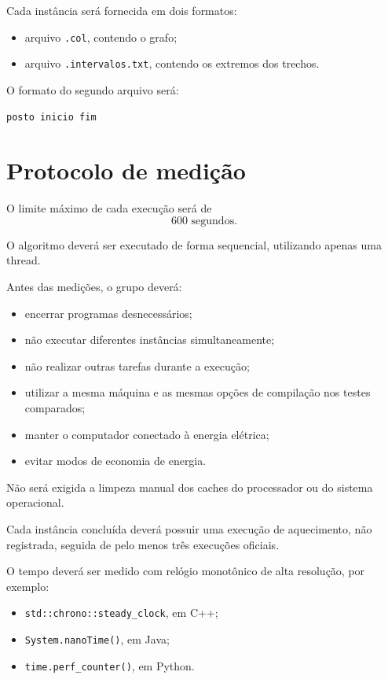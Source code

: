\documentclass[11pt,a4paper]{article}
\begin{document}
Cada instância será fornecida em dois formatos:

\begin{itemize}
    \item arquivo \texttt{.col}, contendo o grafo;
    \item arquivo \texttt{.intervalos.txt}, contendo os extremos dos trechos.
\end{itemize}

O formato do segundo arquivo será:

\begin{lstlisting}
posto inicio fim
\end{lstlisting}

\section{Protocolo de medição}

O limite máximo de cada execução será de
\[
600\text{ segundos}.
\]

O algoritmo deverá ser executado de forma sequencial, utilizando apenas uma thread.

Antes das medições, o grupo deverá:

\begin{itemize}
    \item encerrar programas desnecessários;
    \item não executar diferentes instâncias simultaneamente;
    \item não realizar outras tarefas durante a execução;
    \item utilizar a mesma máquina e as mesmas opções de compilação nos testes comparados;
    \item manter o computador conectado à energia elétrica;
    \item evitar modos de economia de energia.
\end{itemize}

Não será exigida a limpeza manual dos caches do processador ou do sistema operacional.

Cada instância concluída deverá possuir uma execução de aquecimento, não registrada, seguida de pelo menos três execuções oficiais.

O tempo deverá ser medido com relógio monotônico de alta resolução, por exemplo:

\begin{itemize}
    \item \texttt{std::chrono::steady\_clock}, em C++;
    \item \texttt{System.nanoTime()}, em Java;
    \item \texttt{time.perf\_counter()}, em Python.
\end{itemize}
\end{document}
